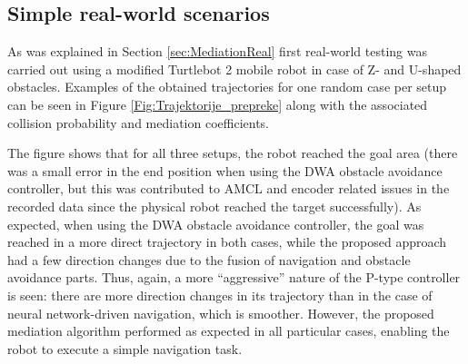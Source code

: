 \subsection{Simple real-world scenarios} \label{sec:MediationRWResults}

As was explained in Section \ref{sec:MediationReal} first real-world testing was carried out using a modified Turtlebot 2 mobile robot in case of Z- and U-shaped obstacles. Examples of the obtained trajectories for one random case per setup can be seen in Figure \ref{Fig:Trajektorije_prepreke} along with the associated collision probability and mediation coefficients. 

The figure shows that for all three setups, the robot reached the goal area (there was a small error in the end position when using the DWA obstacle avoidance controller, but this was contributed to AMCL and encoder related issues in the recorded data since the physical robot reached the target successfully). As expected, when using the DWA obstacle avoidance controller, the goal was reached in a more direct trajectory in both cases, while the proposed approach had a few direction changes due to the fusion of navigation and obstacle avoidance parts. Thus, again, a more ``aggressive'' nature of the P-type controller is seen: there are more direction changes in its trajectory than in the case of neural network-driven navigation, which is smoother. However, the proposed mediation algorithm performed as expected in all particular cases, enabling the robot to execute a simple navigation task. 

